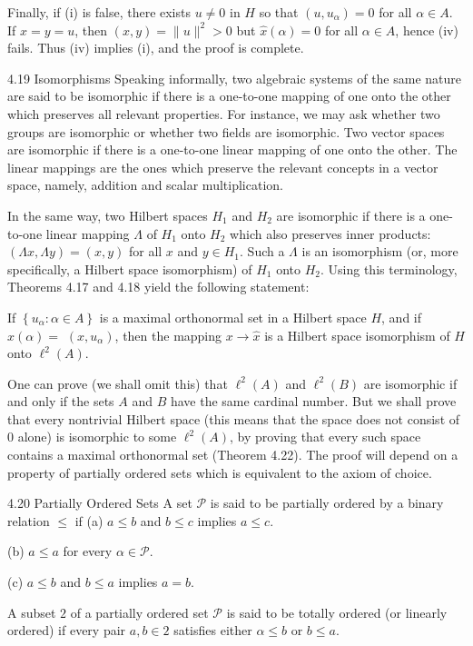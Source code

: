 \documentclass[10pt]{article}
\begin{document}
Finally, if (i) is false, there exists $u \neq 0$ in $H$ so that $\left(u, u_{\alpha}\right)=0$ for all $\alpha \in A$. If $x=y=u$, then $(x, y)=\|u\|^{2}>0$ but $\hat{x}(\alpha)=0$ for all $\alpha \in A$, hence (iv) fails. Thus (iv) implies (i), and the proof is complete.

4.19 Isomorphisms Speaking informally, two algebraic systems of the same nature are said to be isomorphic if there is a one-to-one mapping of one onto the other which preserves all relevant properties. For instance, we may ask whether two groups are isomorphic or whether two fields are isomorphic. Two vector spaces are isomorphic if there is a one-to-one linear mapping of one onto the other. The linear mappings are the ones which preserve the relevant concepts in a vector space, namely, addition and scalar multiplication.

In the same way, two Hilbert spaces $H_{1}$ and $H_{2}$ are isomorphic if there is a one-to-one linear mapping $\Lambda$ of $H_{1}$ onto $H_{2}$ which also preserves inner products: $(\Lambda x, \Lambda y)=(x, y)$ for all $x$ and $y \in H_{1}$. Such a $\Lambda$ is an isomorphism (or, more specifically, a Hilbert space isomorphism) of $H_{1}$ onto $H_{2}$. Using this terminology, Theorems 4.17 and 4.18 yield the following statement:

If $\left\{u_{\alpha}: \alpha \in A\right\}$ is a maximal orthonormal set in a Hilbert space $H$, and if $\hat{x}(\alpha)=$ $\left(x, u_{\alpha}\right)$, then the mapping $x \rightarrow \hat{x}$ is a Hilbert space isomorphism of $H$ onto $\ell^{2}(A)$.

One can prove (we shall omit this) that $\ell^{2}(A)$ and $\ell^{2}(B)$ are isomorphic if and only if the sets $A$ and $B$ have the same cardinal number. But we shall prove that every nontrivial Hilbert space (this means that the space does not consist of 0 alone) is isomorphic to some $\ell^{2}(A)$, by proving that every such space contains a maximal orthonormal set (Theorem 4.22). The proof will depend on a property of partially ordered sets which is equivalent to the axiom of choice.

4.20 Partially Ordered Sets A set $\mathscr{P}$ is said to be partially ordered by a binary relation $\leq$ if
(a) $a \leq b$ and $b \leq c$ implies $a \leq c$.

(b) $a \leq a$ for every $\alpha \in \mathscr{P}$.

(c) $a \leq b$ and $b \leq a$ implies $a=b$.

A subset $\mathscr{2}$ of a partially ordered set $\mathscr{P}$ is said to be totally ordered (or linearly ordered) if every pair $a, b \in 2$ satisfies either $\alpha \leq b$ or $b \leq a$.
\end{document}
